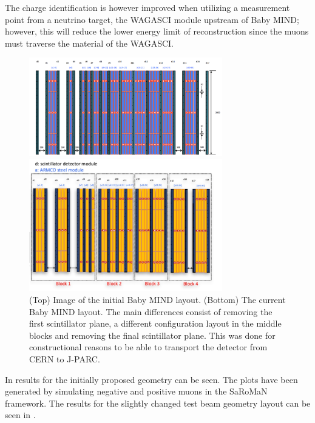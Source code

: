 The charge identification is however improved when utilizing a measurement point from a neutrino target, the WAGASCI module upstream of Baby MIND; however, this will reduce the lower energy limit of reconstruction since the muons must traverse the material of the WAGASCI. 

\begin{figure}[h!]
\centering
\includegraphics[width=0.75\textwidth]{figures/oldStudies/oldMIND.png}

\includegraphics[width=0.75\textwidth]{figures/MIND.jpeg}
\caption{(Top) Image of the initial Baby MIND layout. (Bottom) The current Baby MIND layout. The main differences consist of removing the first scintillator plane, a different configuration layout in the middle blocks and removing the final scintillator plane. This was done for constructional reasons to be able to transport the detector from CERN to J-PARC.}
\label{fig:oldMIND}
\end{figure}

In  results for the initially proposed geometry can be seen. The plots have been generated by simulating negative and positive muons in the SaRoMaN framework. The results for the slightly changed test beam geometry layout can be seen in  . 

